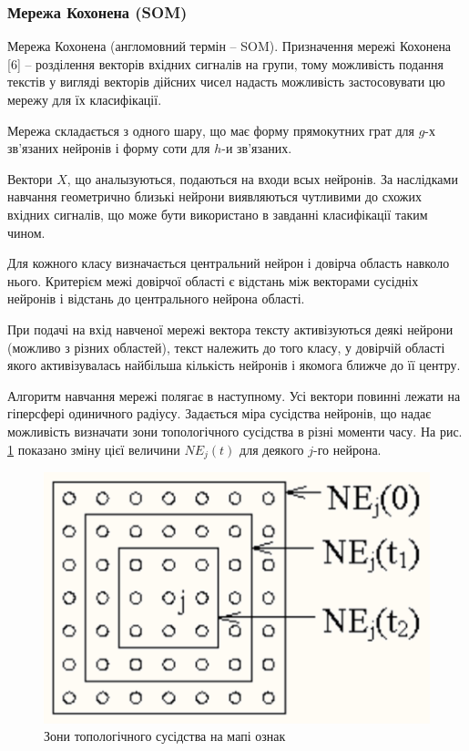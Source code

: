 \subsubsection{Мережа Кохонена (SOM)}
Мережа Кохонена (англомовний термін – SOM). Призначення мережі Кохонена [6] – розділення векторів вхідних сигналів на групи, тому можливість подання текстів у вигляді векторів дійсних чисел надасть можливість застосовувати цю мережу для їх класифікації. 

Мережа складається з одного шару, що має форму прямокутних грат для $g$-х зв’язаних нейронів і форму соти для $h$-и зв’язаних. 

Вектори $X$, що аналызуються, подаються на входи всых нейронів. За наслідками навчання геометрично близькі нейрони виявляються чутливими до схожих вхідних сигналів, що може бути використано в завданні класифікації таким чином.

Для кожного класу визначається центральний нейрон і довірча область навколо нього. Критерієм межі довірчої області є відстань між векторами сусідніх нейронів і відстань до центрального нейрона області. 

При подачі на вхід навченої мережі вектора тексту активізуються деякі нейрони (можливо з різних областей), текст належить до того класу, у довірчій області якого активізувалась найбільша кількість нейронів і якомога ближче до її центру. 

Алгоритм навчання мережі полягає в наступному. Усі вектори повинні лежати на гіперсфері одиничного радіусу. Задається міра сусідства нейронів, що надає можливість визначати зони топологічного сусідства в різні моменти часу. На рис. \ref{fig:learn_neura} показано зміну цієї величини $NE_{j}(t)$ для деякого $j$-го нейрона. 

\begin{figure}[h!]
  \includegraphics[width=\linewidth]{figures/learn_neura.png}
  \caption{Зони топологічного сусідства на мапі ознак}
  \label{fig:learn_neura}
\end{figure}

